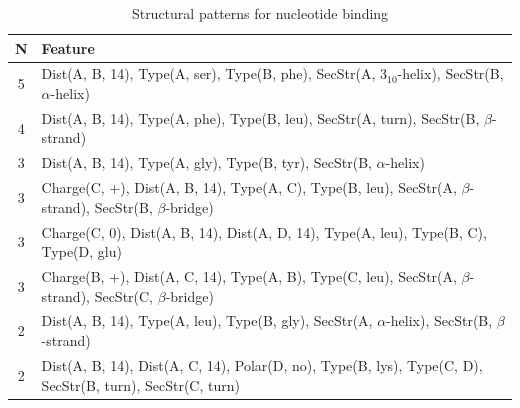 \documentclass[11pt,twoside,a4paper]{book}
\begin{document}
\begin{table}\begin{tabularx}{\textwidth}{cX}\textbf{N} & \textbf{Feature} \\ \hline  
5 & Dist(A, B, 14),  Type(A, ser), Type(B, phe), SecStr(A, $3_{10}$-helix), SecStr(B, $\alpha$-helix)\\ \hline 
4 & Dist(A, B, 14),  Type(A, phe), Type(B, leu), SecStr(A, turn), SecStr(B, $\beta$-strand)\\ \hline 
3 & Dist(A, B, 14),  Type(A, gly), Type(B, tyr), SecStr(B, $\alpha$-helix)\\ \hline 
3 & Charge(C, +), Dist(A, B, 14),  Type(A, C), Type(B, leu), SecStr(A, $\beta$-strand), \newline SecStr(B, $\beta$-bridge)\\ \hline 
3 & Charge(C, 0), Dist(A, B, 14), Dist(A, D, 14),  Type(A, leu), Type(B, C), \newline Type(D, glu)\\ \hline 
3 & Charge(B, +), Dist(A, C, 14),  Type(A, B), Type(C, leu), SecStr(A, $\beta$-strand), \newline SecStr(C, $\beta$-bridge)\\ \hline 
2 & Dist(A, B, 14),  Type(A, leu), Type(B, gly), SecStr(A, $\alpha$-helix), SecStr(B, $\beta$-strand)\\ \hline 
2 & Dist(A, B, 14), Dist(A, C, 14), Polar(D, no),  Type(B, lys), Type(C, D), \newline SecStr(B, turn), SecStr(C, turn)\\ \hline 
 \end{tabularx}\caption{Structural patterns for nucleotide binding}\label{tab:nucleotide_binding}\end{table}
\end{document}
